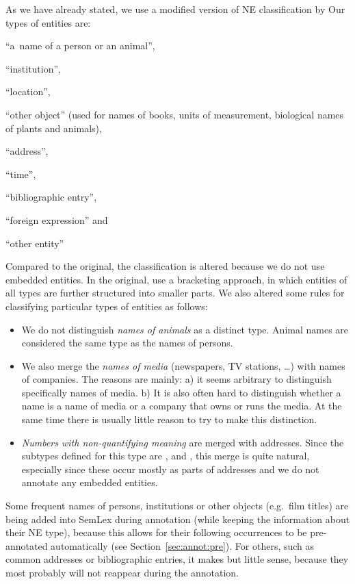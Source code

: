 As we have already stated, we use a modified version of NE classification by \citet{sevcikova:2007}  Our types of entities are:
\begin{compactenum}
\item ``a~name of a person or an animal'', 
\item``institution'', 
\item``location'', 
\item``other object'' (used for names of books, units of measurement, biological names of plants and animals), 
\item``address'', 
\item``time'', 
\item``bibliographic entry'', 
\item``foreign expression'' and 
\item``other entity''
\end{compactenum}

Compared to the original, the classification is altered because we do not use embedded entities. In the original, \citeauthor{sevcikova:2007} use a bracketing approach, in which entities of all types are further structured into smaller parts. We also altered some rules for classifying particular types of entities as follows:
\begin{itemize}
\item  We do not distinguish \emph{names of animals} as a distinct type. Animal names are considered the same type as the names of persons.
\item We also merge the \emph{names of media} (newspapers, TV stations, \ldots) with names of companies. The reasons are mainly: a) it seems arbitrary to distinguish specifically names of media. b) It is also often hard to distinguish whether a name is a name of media or a company that owns or runs the media. At the same time there is usually little reason to try to make this distinction.
\item \emph{Numbers with non-quantifying meaning} are merged with addresses. Since the subtypes defined for this type are ,  and , this merge is quite natural, especially since these occur mostly as parts of addresses and we do not annotate any embedded entities.
\end{itemize}

Some frequent names of persons, institutions or other objects (e.g.~film titles) are being added into SemLex during annotation (while keeping the information about their NE type), because this allows for their following occurrences to be pre-annotated automatically (see Section~\ref{sec:annot:pre}). For others, such as common addresses or bibliographic entries, it makes but little sense, because they most probably will not reappear during the annotation. 

